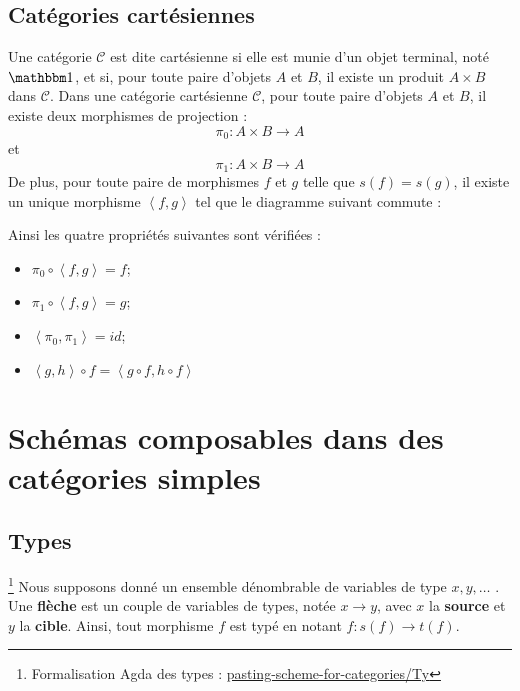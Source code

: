 \documentclass[conference]{IEEEtran}
\begin{document}
	\subsection{Catégories cartésiennes} Une catégorie $\mathcal{C}$ est dite cartésienne si elle est munie d'un objet terminal, noté $\mathbbm 1$, et si, pour toute paire d'objets $A$ et $B$, il existe un produit $A \times B$ dans $\mathcal C$.
	Dans une catégorie cartésienne $\mathcal{C}$, pour toute paire d'objets $A$ et $B$, il existe deux morphismes de projection : $$\pi_0 : A \times B \rightarrow A$$ et $$\pi_1 : A \times B \rightarrow A$$
	De plus, pour toute paire de morphismes $f$ et $g$ telle que $s(f) = s(g)$, il existe un unique morphisme $\left<f, g\right>$ tel que le diagramme suivant commute :
	
	\begin{center}
	\end{center}
	
	Ainsi les quatre propriétés suivantes sont vérifiées :
	\begin{itemize}
		\item $\pi_0 \circ \left<f, g\right> = f$;
		\item $\pi_1 \circ \left<f, g\right> = g$;
		\item $\left<\pi_0, \pi_1\right> = id$;
		\item $\left<g , h\right> \circ f = \left<g \circ f, h \circ f\right>$
	\end{itemize}
	
	\section{Schémas composables dans des catégories simples} \label{cat}
	
	\subsection{Types}
	\footnote{Formalisation Agda des types :  \href{https://github.com/ehouget/L3-ENS-Internship/tree/main/pasting-scheme-for-categories/Ty}{pasting-scheme-for-categories/Ty}}
	Nous supposons donné un ensemble dénombrable de variables de type $x, y, \dots$ . Une \textbf{flèche} est un couple de variables de types, notée $x \rightarrow y$, avec $x$ la \textbf{source} et $y$ la \textbf{cible}. Ainsi, tout morphisme $f$ est typé en notant $f : s(f) \rightarrow t(f)$.
	
\end{document}
